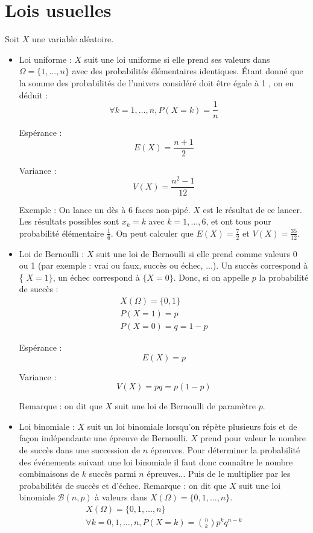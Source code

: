\section{Lois usuelles}

Soit \(X\) une variable aléatoire.

\begin{itemize}
    \item Loi uniforme : \(X\) suit une loi uniforme si elle prend ses valeurs dans \(\Omega=\{1, \ldots, n\}\) avec des probabilités élémentaires identiques. Étant donné que la somme des probabilités de l'univers considéré doit être égale à 1 , on en déduit :
    \[
    \forall k=1, \ldots, n, P(X=k)=\frac{1}{n}
    \]
    
    Espérance :
    \[
    E(X)=\frac{n+1}{2}
    \]
    
    Variance :
    \[
    V(X)=\frac{n^{2}-1}{12}
    \]
    
    Exemple : On lance un dès à 6 faces non-pipé. \(X\) est le résultat de ce lancer. Les résultats possibles sont \(x_{k}=k\) avec \(k=1, \ldots, 6\), et ont tous pour probabilité élémentaire \(\frac{1}{6}\). On peut calculer que \(E(X)=\frac{7}{2}\) et \(V(X)=\frac{35}{12}\).
    \item Loi de Bernoulli : \(X\) suit une loi de Bernoulli si elle prend comme valeurs 0 ou 1 (par exemple : vrai ou faux, succès ou échec, ...). Un succès correspond à \{ \(X=1\}\), un échec correspond à \(\{X=0\}\). Donc, si on appelle \(p\) la probabilité de succès :
    \[
    \begin{gathered}
    X(\Omega)=\{0,1\} \\
    P(X=1)=p \\
    P(X=0)=q=1-p
    \end{gathered}
    \]
    
    Espérance :
    \[
    E(X)=p
    \]
    
    Variance :
    \[
    V(X)=p q=p(1-p)
    \]
    
    Remarque : on dit que \(X\) suit une loi de Bernoulli de paramètre \(p\).
    \item Loi binomiale : \(X\) suit un loi binomiale lorsqu'on répète plusieurs fois et de façon indépendante une épreuve de Bernoulli. \(X\) prend pour valeur le nombre de succès dans une succession de \(n\) épreuves. Pour déterminer la probabilité des événements suivant une loi binomiale il faut donc connaître le nombre combinaisons de \(k\) succès parmi \(n\) épreuves... Puis de le multiplier par les probabilités de succès et d'échec.
    Remarque : on dit que \(X\) suit une loi binomiale \(\mathcal{B}(n, p)\) à valeurs dans \(X(\Omega)=\{0,1, \ldots, n\}\).
    \[
    \begin{gathered}
    X(\Omega)=\{0,1, \ldots, n\} \\
    \forall k=0,1, \ldots, n, P(X=k)=\binom{n}{k} p^{k} q^{n-k}
    \end{gathered}
    \]
    

\end{itemize}
